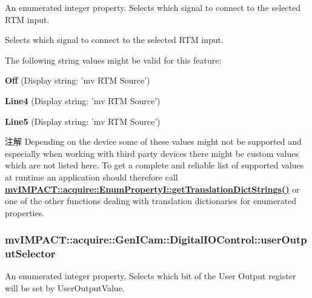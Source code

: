 An enumerated integer property. Selects which signal to connect to the selected R\+T\+M input. 

Selects which signal to connect to the selected R\+T\+M input.

The following string values might be valid for this feature\+:
\begin{DoxyItemize}
\item {\bfseries Off} (Display string\+: 'mv R\+T\+M Source')
\item {\bfseries Line4} (Display string\+: 'mv R\+T\+M Source')
\item {\bfseries Line5} (Display string\+: 'mv R\+T\+M Source')
\end{DoxyItemize}

\begin{DoxyNote}{注解}
Depending on the device some of these values might not be supported and especially when working with third party devices there might be custom values which are not listed here. To get a complete and reliable list of supported values at runtime an application should therefore call {\bfseries \hyperlink{classmv_i_m_p_a_c_t_1_1acquire_1_1_enum_property_i_a0ba6ccbf5ee69784d5d0b537924d26b6}{mv\+I\+M\+P\+A\+C\+T\+::acquire\+::\+Enum\+Property\+I\+::get\+Translation\+Dict\+Strings()}} or one of the other functions dealing with translation dictionaries for enumerated properties. 
\end{DoxyNote}
\hypertarget{classmv_i_m_p_a_c_t_1_1acquire_1_1_gen_i_cam_1_1_digital_i_o_control_a9d77f4a5ce746a4db6d50ca6d3f72c62}{
\subsubsection[{user\+Output\+Selector}]{ mv\+I\+M\+P\+A\+C\+T\+::acquire\+::\+Gen\+I\+Cam\+::\+Digital\+I\+O\+Control\+::user\+Output\+Selector}}\label{classmv_i_m_p_a_c_t_1_1acquire_1_1_gen_i_cam_1_1_digital_i_o_control_a9d77f4a5ce746a4db6d50ca6d3f72c62}


An enumerated integer property. Selects which bit of the User Output register will be set by User\+Output\+Value. 

